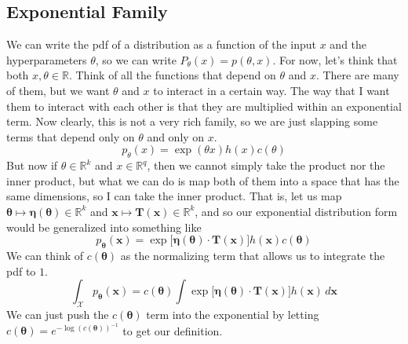 \documentclass{article}
\theoremstyle{definition}
\begin{document}
  \subsection{Exponential Family}

  We can write the pdf of a distribution as a function of the input $x$ and the hyperparameters $\theta$, so we can write $P_\theta (x) = p(\theta, x)$. For now, let's think that both $x, \theta \in \mathbb{R}$. Think of all the functions that depend on $\theta$ and $x$. There are many of them, but we want $\theta$ and $x$ to interact in a certain way. The way that I want them to interact with each other is that they are multiplied within an exponential term. Now clearly, this is not a very rich family, so we are just slapping some terms that depend only on $\theta$ and only on $x$. 
  \[p_\theta (x) = \exp(\theta x) h(x) c(\theta)\]
  But now if $\theta \in \mathbb{R}^k$ and $x \in \mathbb{R}^q$, then we cannot simply take the product nor the inner product, but what we can do is map both of them into a space that has the same dimensions, so I can take the inner product. That is, let us map $\boldsymbol{\theta} \mapsto \boldsymbol{\eta}(\boldsymbol{\theta}) \in \mathbb{R}^k$ and $\mathbf{x} \mapsto \mathbf{T}(\mathbf{x}) \in \mathbb{R}^k$, and so 
  our exponential distribution form would be generalized into something like 
  \[p_{\boldsymbol{\theta}} (\mathbf{x}) = \exp\big[ \boldsymbol{\eta}(\boldsymbol{\theta}) \cdot \mathbf{T}(\mathbf{x}) \big] h(\mathbf{x}) c(\boldsymbol{\theta})\]
  We can think of $c(\boldsymbol{\theta})$ as the normalizing term that allows us to integrate the pdf to $1$. 
  \[\int_\mathcal{X} p_{\boldsymbol{\theta}} (\mathbf{x}) = c(\boldsymbol{\theta}) \int \exp\big[\boldsymbol{\eta}(\boldsymbol{\theta}) \cdot \mathbf{T}(\mathbf{x}) \big] h(\mathbf{x})  \,d\mathbf{x}\]
  We can just push the $c(\boldsymbol{\theta})$ term into the exponential by letting $c(\boldsymbol{\theta}) = e^{-\log(c(\boldsymbol{\theta}))^{-1}}$ to get our definition. 
\end{document}
